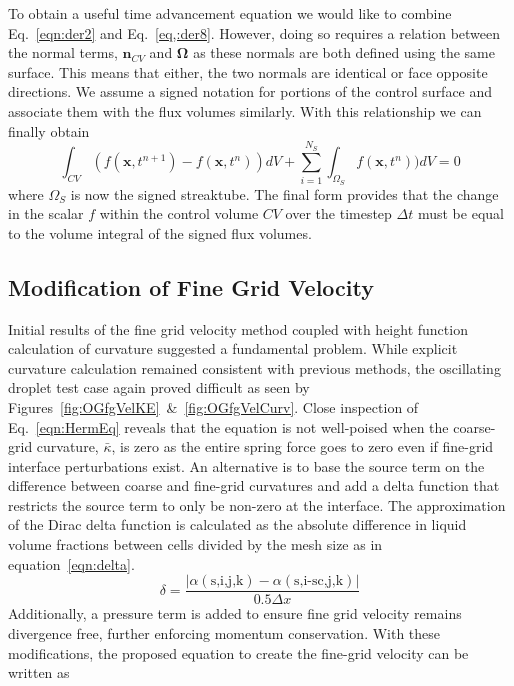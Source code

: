 To obtain a useful time advancement equation we would like to combine Eq.~\ref{eqn:der2} and Eq.~\ref{eq,:der8}. However, doing so requires a relation between the normal terms, $\bm{n}_{CV}$ and $\bm{\Omega}$ as these normals are both defined using the same surface. This means that either, the two normals are identical or face opposite directions. We assume a signed notation for portions of the control surface and associate them with the flux volumes similarly. With this relationship we can finally obtain 
 \begin{equation}
	 \int_{CV} (f (\bm{x} , t^{n+1}) - f (\bm{x} , t^{n}) )dV + \sum_{i=1}^{N_S}\int_{\Omega_S} f (\bm{x} , t^{n}) )dV =0
	 \label{eqn:derFinal}
 \end{equation}
where $\Omega_S$ is now the signed streaktube. The final form provides that the change in the scalar $f$  within the control volume $CV$ over the timestep $\Delta t$ must be equal to the volume integral of the signed flux volumes.

\subsection{Modification of Fine Grid Velocity}
Initial results of the fine grid velocity method coupled with height function calculation of curvature suggested a fundamental problem. While explicit curvature calculation remained consistent with previous methods, the oscillating droplet test case again proved difficult as seen by Figures~\ref{fig:OGfgVelKE}~\&~\ref{fig:OGfgVelCurv}. Close inspection of Eq.~\ref{eqn:HermEq} reveals that the equation is not well-poised when the coarse-grid curvature, $\bar{\kappa}$, is zero as the entire spring force goes to zero even if fine-grid interface perturbations exist.  An alternative is to base the source term on the difference between coarse and fine-grid curvatures and add a delta function that restricts the source term to only be non-zero at the interface.  The approximation of the Dirac delta function is calculated as the absolute difference in liquid volume fractions between cells divided by the mesh size as in equation~\ref{eqn:delta}.
\begin{equation}
\delta = \frac{|\alpha(\text{s,i,j,k}) - \alpha(\text{s,i-sc,j,k}) | }{0.5 \Delta x}
\label{eqn:delta}
\end{equation}
 Additionally, a pressure term is added to ensure fine grid velocity remains divergence free, further enforcing momentum conservation. With these modifications, the proposed equation to create the fine-grid velocity can be written as

